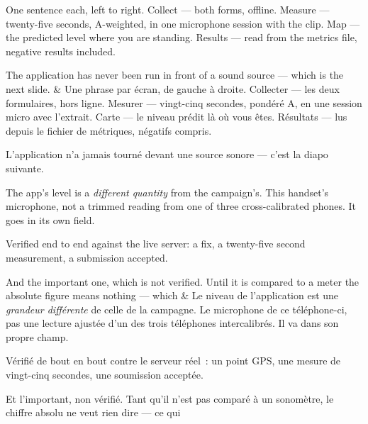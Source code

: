 \documentclass[10pt,a4paper]{article}
\begin{document}
\begin{say}
One sentence each, left to right. Collect --- both forms, offline. Measure ---
twenty-five seconds, A-weighted, in one microphone session with the clip. Map ---
the predicted level where you are standing. Results --- read from the metrics
file, negative results included.

 The application has never been run in front of a sound
source --- which is the next slide.
&
Une phrase par écran, de gauche à droite. Collecter --- les deux formulaires, hors
ligne. Mesurer --- vingt-cinq secondes, pondéré A, en une session micro avec
l'extrait. Carte --- le niveau prédit là où vous êtes. Résultats --- lus depuis le
fichier de métriques, négatifs compris.

 L'application n'a jamais tourné devant une source
sonore --- c'est la diapo suivante.
\end{say}

\begin{say}
The app's level is a \emph{different quantity} from the campaign's. This
handset's microphone, not a trimmed reading from one of three cross-calibrated
phones. It goes in its own field. 

Verified end to end against the live server: a fix, a twenty-five second
measurement, a submission accepted.

And the important one, which is not verified.  Until it is compared to a meter the absolute
figure means nothing --- which 
&
Le niveau de l'application est une \emph{grandeur différente} de celle de la
campagne. Le microphone de ce téléphone-ci, pas une lecture ajustée d'un des trois
téléphones intercalibrés. Il va dans son propre champ. 

Vérifié de bout en bout contre le serveur réel~: un point GPS, une mesure de
vingt-cinq secondes, une soumission acceptée.

Et l'important, non vérifié.  Tant qu'il n'est pas comparé à un sonomètre, le chiffre absolu ne veut
rien dire --- ce qui 
\end{say}
\end{document}
